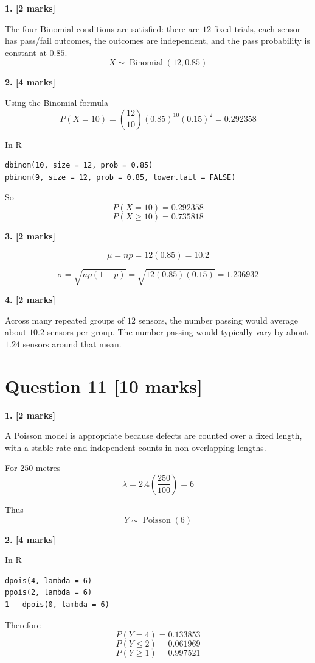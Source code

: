 \documentclass[10pt,letterpaper]{article}
\begin{document}
\textbf{1. [2 marks]}

The four Binomial conditions are satisfied: there are \(12\) fixed trials, each sensor has pass/fail outcomes, the outcomes are independent, and the pass probability is constant at \(0.85\). 
$$\boxed{X\sim\operatorname{Binomial}(12,0.85)}$$

\textbf{2. [4 marks]}

Using the Binomial formula
$$P(X=10)=\binom{12}{10}(0.85)^{10}(0.15)^2=\boxed{0.292358}$$

In R
\begin{lstlisting}
dbinom(10, size = 12, prob = 0.85)
pbinom(9, size = 12, prob = 0.85, lower.tail = FALSE)
\end{lstlisting}

So
$$\boxed{P(X=10)=0.292358}$$
$$\boxed{P(X\ge10)=0.735818}$$

\textbf{3. [2 marks]}

$$\mu=np=12(0.85)=\boxed{10.2}$$

$$\sigma=\sqrt{np(1-p)}=\sqrt{12(0.85)(0.15)}=\boxed{1.236932}$$

\textbf{4. [2 marks]}

Across many repeated groups of \(12\) sensors, the number passing would average about \(10.2\) sensors per group. The number passing would typically vary by about \(1.24\) sensors around that mean.

\section*{Question 11 \hfill [10 marks]}

\textbf{1. [2 marks]}

A Poisson model is appropriate because defects are counted over a fixed length, with a stable rate and independent counts in non-overlapping lengths.

For \(250\) metres
$$\lambda=2.4\left(\frac{250}{100}\right)=\boxed{6}$$

Thus
$$\boxed{Y\sim\operatorname{Poisson}(6)}$$

\textbf{2. [4 marks]}

In R
\begin{lstlisting}
dpois(4, lambda = 6)
ppois(2, lambda = 6)
1 - dpois(0, lambda = 6)
\end{lstlisting}

Therefore
$$\boxed{P(Y=4)=0.133853}$$
$$\boxed{P(Y\le2)=0.061969}$$
$$\boxed{P(Y\ge1)=0.997521}$$
\end{document}
